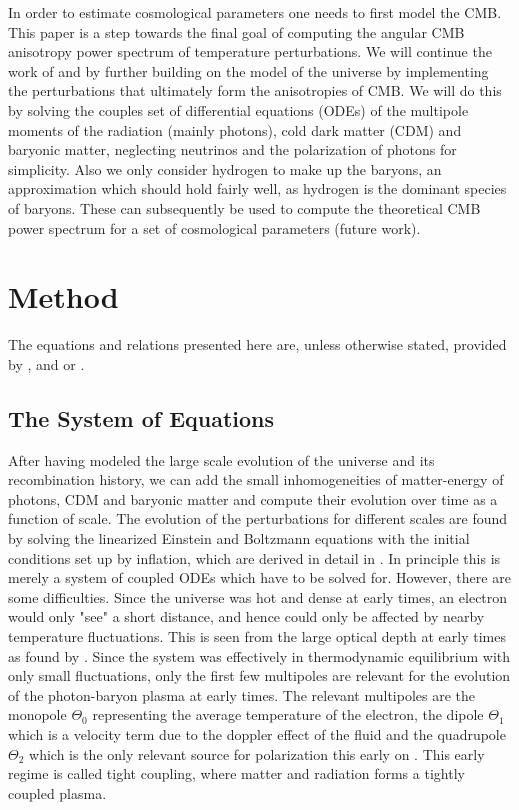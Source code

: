 \documentclass[twocolumn]{aastex62}
\begin{document}
In order to estimate cosmological parameters one needs to first model the CMB. This paper is a step towards the final goal of computing the angular CMB anisotropy power spectrum of temperature perturbations. We will continue the work of \cite{stutzer:2020a} and \cite{stutzer:2020b} by further building on the model of the universe by implementing the perturbations that ultimately form the anisotropies of CMB. We will do this by solving the couples set of differential equations (ODEs) of the multipole moments of the radiation (mainly photons), cold dark matter (CDM) and baryonic matter, neglecting neutrinos and the polarization of photons for simplicity. Also we only consider hydrogen to make up the baryons, an approximation which should hold fairly well, as hydrogen is the dominant species of baryons. These can subsequently be used to compute the theoretical CMB power spectrum for a set of cosmological parameters (future work).

\section{Method} \label{sec:Method}
The equations and relations presented here are, unless otherwise stated, provided by \cite{callin:2006}, \cite{winther:2020b} and or \cite{dodelson:2003}.

\subsection{The System of Equations} \label{subsec:system}
After having modeled the large scale evolution of the universe and its recombination history, we can add the small inhomogeneities of matter-energy of photons, CDM and baryonic matter and compute their evolution over time as a function of scale. The evolution of the perturbations for different scales are found by solving the linearized Einstein and Boltzmann equations with the initial conditions set up by inflation, which are derived in detail in \cite{dodelson:2003}. In principle this is merely a system of coupled ODEs which have to be solved for. However, there are some difficulties. Since the universe was hot and dense at early times, an electron would only "see" a short distance, and hence could only be affected by nearby temperature fluctuations. This is seen from the large optical depth at early times as found by \cite{stutzer:2020b}. Since the system was effectively in thermodynamic equilibrium with only small fluctuations, only the first few multipoles are relevant for the evolution of the photon-baryon plasma at early times. The relevant multipoles are the monopole $\Theta_0$ representing the average temperature of the electron, the dipole $\Theta_1$ which is a velocity term due to the doppler effect of the fluid and the quadrupole $\Theta_2$ which is the only relevant source for polarization this early on \citep[]{winther:2020b}. This early regime is called tight coupling, where matter and radiation forms a tightly coupled plasma.
\end{document}
